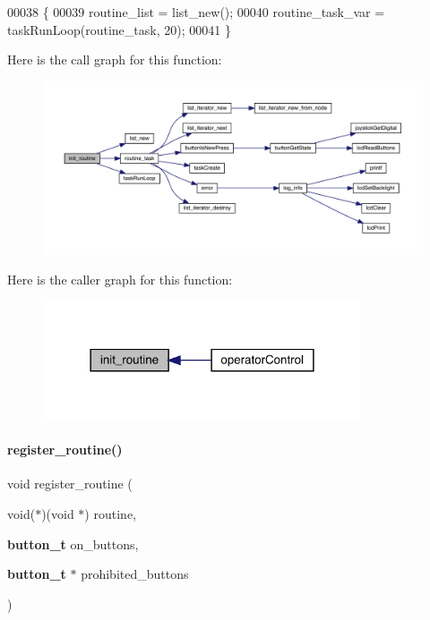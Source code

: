 \begin{DoxyCode}
00038                     \{
00039   routine_list = list_new();
00040   routine_task_var = taskRunLoop(routine_task, 20);
00041 \}
\end{DoxyCode}
Here is the call graph for this function\+:
\nopagebreak
\begin{figure}[H]
\begin{center}
\leavevmode
\includegraphics[width=350pt]{routines_8h_ab873e24fcc59a2bf7844618b664a5d26_cgraph}
\end{center}
\end{figure}
Here is the caller graph for this function\+:
\nopagebreak
\begin{figure}[H]
\begin{center}
\leavevmode
\includegraphics[width=266pt]{routines_8h_ab873e24fcc59a2bf7844618b664a5d26_icgraph}
\end{center}
\end{figure}
\mbox{\label{routines_8h_a9486ebd51b8c3d966619cf4617e6a930}} 
\paragraph{register\+\_\+routine()}
{\footnotesize\ttfamily void register\+\_\+routine (\begin{DoxyParamCaption}\item[{void($\ast$)(void $\ast$)}]{routine,  }\item[{\textbf{ button\+\_\+t}}]{on\+\_\+buttons,  }\item[{\textbf{ button\+\_\+t} $\ast$}]{prohibited\+\_\+buttons }\end{DoxyParamCaption})}



